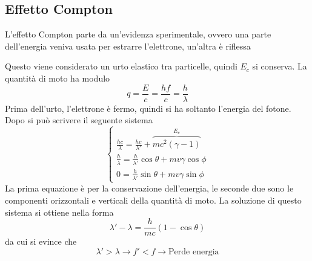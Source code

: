\subsection{Effetto Compton}
L'effetto Compton parte da un'evidenza sperimentale, ovvero una parte dell'energia veniva usata per
estrarre l'elettrone, un'altra è riflessa
\begin{center}
\end{center}
Questo viene considerato un urto elastico tra particelle, quindi $E_c$ si conserva. La quantità di 
moto ha modulo
\begin{equation*}
  q = \frac{E}{c}= \frac{hf}{c} = \frac{h}{\lambda}
\end{equation*}
Prima dell'urto, l'elettrone è fermo, quindi si ha soltanto l'energia del fotone. Dopo si può 
scrivere il seguente sistema
\begin{equation*}
  \begin{cases}
    \frac{hc}{\lambda}=\frac{hc}{\lambda'} + \overbrace{mc^2(\gamma-1)}^{E_c}\\
    \frac{h}{\lambda}=\frac{h}{\lambda'}\cos\theta+mv\gamma\cos\phi\\
    0=\frac{h}{\lambda'}\sin\theta+mv\gamma\sin\phi
  \end{cases}
\end{equation*}
La prima equazione è per la conservazione dell'energia, le seconde due sono le componenti orizzontali
e verticali della quantità di moto. La soluzione di questo sistema si ottiene nella forma
\begin{equation*}
  \lambda'-\lambda=\frac{h}{mc}(1-\cos\theta)
\end{equation*}
da cui si evince che
\begin{equation*}
  \lambda'>\lambda \rightarrow f'<f \rightarrow \text{Perde energia}
\end{equation*}


